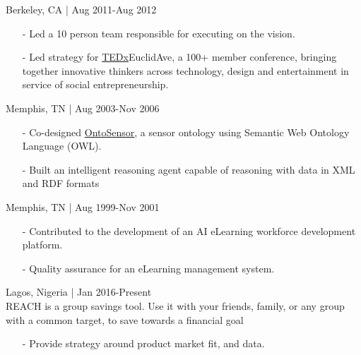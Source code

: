 \documentclass[11pt,article,oneside]{memoir}
\begin{document}
 \hfill Berkeley, CA | Aug 2011-Aug 2012
\begin{itemize}[noitemsep,nolistsep]
\item[-]Led a 10 person team responsible for executing on the vision.
\item[-]Led strategy for \href{http://www.ted.com/tedx/events/3790}{TEDx}EuclidAve, a 100+ member conference, bringing together innovative thinkers across technology, design and entertainment in service of social entrepreneurship.
\end{itemize}

 \hfill Memphis, TN | Aug 2003-Nov 2006
\begin{itemize}[nolistsep]
\item[-]Co-designed \href{https://scholar.google.com/scholar?hl=en&q=Building+a+Sensor+Ontology\%3A+A+Practical+Approach+Leveraging+ISO+and+OGC+Models.&btnG=&as_sdt=1\%2C43&as_sdtp=}{OntoSensor}, a sensor ontology using Semantic Web Ontology Language (OWL).
\item[-]Built an intelligent reasoning agent capable of reasoning with data in XML and RDF formats
\end{itemize}

 \hfill Memphis, TN | Aug 1999-Nov 2001
\begin{itemize}[nolistsep]
\item[-]Contributed to the development of an AI eLearning workforce development platform.
\item[-]Quality assurance for an eLearning management system.
\end{itemize} 

\bigskip

\medskip

 \hfill Lagos, Nigeria | Jan 2016-Present\\
REACH is a group savings tool. Use it with your friends, family, or any group with a common target, to save towards a financial goal
\begin{itemize}[nolistsep]
\item[-] Provide strategy around product market fit, and data.
\end{itemize}  
\end{document}
